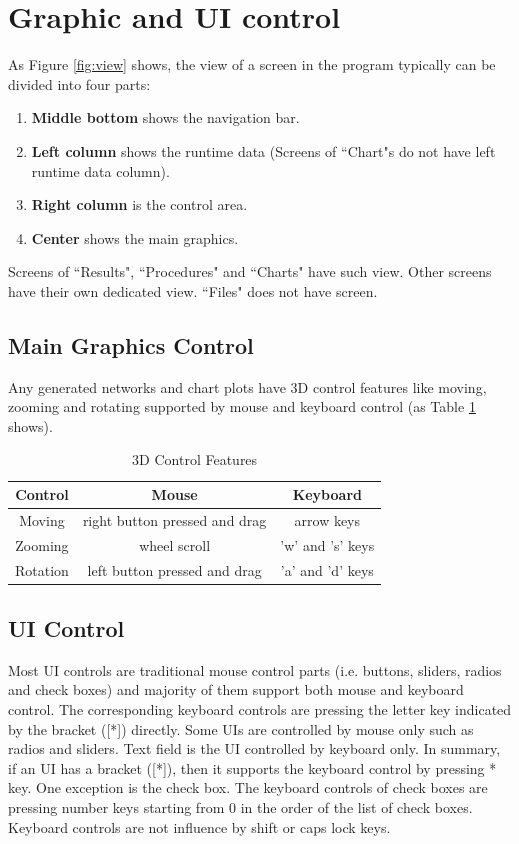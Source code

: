 \documentclass[11pt]{amsart}
\begin{document}
\section{Graphic and \ac{UI} control}
As Figure \ref{fig:view} shows, the view of a screen in the program typically can be divided into four parts:
\begin{enumerate}
	\item \textbf{Middle bottom} shows the navigation bar.
	\item \textbf{Left column} shows the runtime data (Screens of ``Chart"s do not have left runtime data column).
	\item \textbf{Right column} is the control area.
	\item \textbf{Center} shows the main graphics.
\end{enumerate}
Screens of ``Results", ``Procedures" and ``Charts" have such view. Other screens have their own dedicated view. ``Files" does not have screen.
\subsection{Main Graphics Control}
Any generated networks and chart plots have 3D control features like moving, zooming and rotating supported by mouse and keyboard control (as Table \ref{tab:3d_control} shows).
\begin{table}[ht]
	\caption{3D Control Features}
	\label{tab:3d_control}
	\begin{tabular}{|c|c|c|}
		\toprule
		Control&Mouse&Keyboard\\
		\midrule
		Moving&right button pressed and drag&arrow keys\\
		\midrule
		Zooming&wheel scroll&'w' and 's' keys\\
		\midrule
		Rotation&left button pressed and drag\footnotemark&'a' and 'd' keys\\
		\bottomrule
	\end{tabular}
\end{table}
\subsection{\ac{UI} Control}
Most \ac{UI} controls are traditional mouse control parts (i.e. buttons, sliders, radios and check boxes) and majority of them support both mouse and keyboard control. The corresponding keyboard controls are pressing the letter key indicated by the bracket ([*]) directly. Some \acp{UI} are controlled by mouse only such as radios and sliders. Text field is the \ac{UI} controlled by keyboard only. In summary, if an \ac{UI} has a bracket ([*]), then it supports the keyboard control by pressing * key. One exception is the check box. The keyboard controls of check boxes are pressing number keys starting from $0$ in the order of the list of check boxes. Keyboard controls are not influence by shift or caps lock keys.


\end{document}
